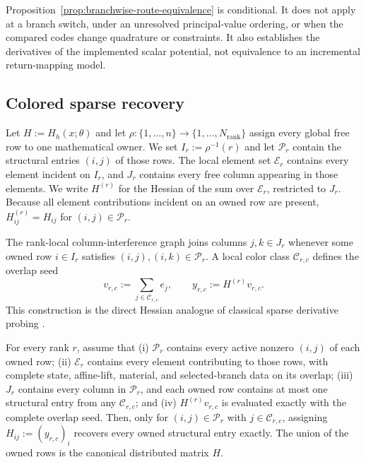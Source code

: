Proposition~\ref{prop:branchwise-route-equivalence} is conditional. It does not
apply at a branch switch, under an unresolved principal-value ordering, or when
the compared codes change quadrature or constraints. It also establishes the
derivatives of the implemented scalar potential, not equivalence to an
incremental return-mapping model.

\subsection{Colored sparse recovery}
\label{subsec:colored-recovery}

Let $H:=H_h(x;\theta)$ and let
$\rho:\{1,\ldots,n\}\to\{1,\ldots,N_{\mathrm{rank}}\}$ assign every global
free row to one mathematical owner. We set $I_r:=\rho^{-1}(r)$ and let
$\mathcal{P}_r$ contain the structural entries $(i,j)$ of those rows.
The local element set $\mathcal{E}_r$ contains every element incident on
$I_r$, and $J_r$ contains every free column appearing in those elements.  We
write $H^{(r)}$ for the Hessian of the sum over $\mathcal{E}_r$, restricted to
$J_r$.  Because all element contributions incident on an owned row are present,
$H^{(r)}_{ij}=H_{ij}$ for $(i,j)\in\mathcal{P}_r$.

The rank-local column-interference graph joins columns $j,k\in J_r$ whenever
some owned row $i\in I_r$ satisfies
$(i,j),(i,k)\in\mathcal{P}_r$. A local color class
$\mathcal{C}_{r,c}$ defines the overlap seed
\begin{equation}
  v_{r,c}:=\sum_{j\in\mathcal{C}_{r,c}}e_j,
  \qquad y_{r,c}:=H^{(r)}v_{r,c}.
  \label{eq:colored-seed}
\end{equation}
This construction is the direct Hessian analogue of classical sparse
derivative probing \citep{curtis1974sparsejacobian,coleman1984sparsehessian}.

\begin{proposition}
\label{prop:owned-row-colored-recovery}
For every rank $r$, assume that (i) $\mathcal{P}_r$ contains every active
nonzero $(i,j)$ of each owned row; (ii) $\mathcal{E}_r$ contains every element
contributing to those rows, with complete state, affine-lift, material, and
selected-branch data on its overlap; (iii) $J_r$ contains every column in
$\mathcal{P}_r$, and each owned row contains at most one structural entry from
any $\mathcal{C}_{r,c}$; and (iv) $H^{(r)}v_{r,c}$ is evaluated exactly with
the complete overlap seed. Then, only for $(i,j)\in\mathcal{P}_r$ with
$j\in\mathcal{C}_{r,c}$, assigning
$H_{ij}:=(y_{r,c})_i$ recovers every owned structural entry exactly. The union
of the owned rows is the canonical distributed matrix $H$.
\end{proposition}

